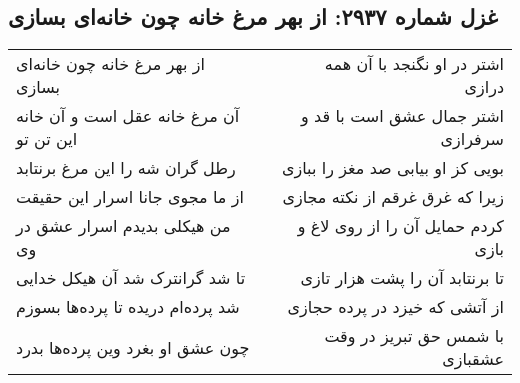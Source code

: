 \begin{center}
\section*{غزل شماره ۲۹۳۷: از بهر مرغ خانه چون خانه‌ای بسازی}
\label{sec:2937}
\begin{longtable}{l p{0.5cm} r}
از بهر مرغ خانه چون خانه‌ای بسازی
&&
اشتر در او نگنجد با آن همه درازی
\\
آن مرغ خانه عقل است و آن خانه این تن تو
&&
اشتر جمال عشق است با قد و سرفرازی
\\
رطل گران شه را این مرغ برنتابد
&&
بویی کز او بیابی صد مغز را ببازی
\\
از ما مجوی جانا اسرار این حقیقت
&&
زیرا که غرق غرقم از نکته مجازی
\\
من هیکلی بدیدم اسرار عشق در وی
&&
کردم حمایل آن را از روی لاغ و بازی
\\
تا شد گرانترک شد آن هیکل خدایی
&&
تا برنتابد آن را پشت هزار تازی
\\
شد پرده‌ام دریده تا پرده‌ها بسوزم
&&
از آتشی که خیزد در پرده حجازی
\\
چون عشق او بغرد وین پرده‌ها بدرد
&&
با شمس حق تبریز در وقت عشقبازی
\\
\end{longtable}
\end{center}
